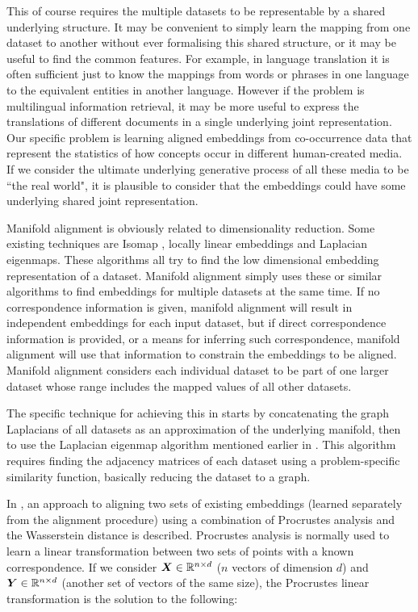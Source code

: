 This of course requires the multiple datasets to be representable by a shared underlying structure. It may be convenient to simply learn the mapping from one dataset to another without ever formalising this shared structure, or it may be useful to find the common features. For example, in language translation it is often sufficient just to know the mappings from words or phrases in one language to the equivalent entities in another language. However if the problem is multilingual information retrieval, it may be more useful to express the translations of different documents in a single underlying joint representation. Our specific problem is learning aligned embeddings from co-occurrence data that represent the statistics of how concepts occur in different human-created media. If we consider the ultimate underlying generative process of all these media to be ``the real world", it is plausible to consider that the embeddings could have some underlying shared joint representation. 

Manifold alignment is obviously related to dimensionality reduction. Some existing techniques are Isomap , locally linear embeddings and Laplacian eigenmaps. These algorithms all try to find the low dimensional embedding representation of a dataset. Manifold alignment simply uses these or similar algorithms to find embeddings for multiple datasets at the same time. If no correspondence information is given, manifold alignment will result in independent embeddings for each input dataset, but if direct correspondence information is provided, or a means for inferring such correspondence, manifold alignment will use that information to constrain the embeddings to be aligned. Manifold alignment considers each individual dataset to be part of one larger dataset whose range includes the mapped values of all other datasets. 

The specific technique for achieving this in \cite{ManifoldLearningTheoryAndApplications} starts by concatenating the graph Laplacians of all datasets as an approximation of the underlying manifold, then to use the Laplacian eigenmap algorithm mentioned earlier in \cite{LaplacianEigenmaps}. This algorithm requires finding the adjacency matrices of each dataset using a problem-specific similarity function, basically reducing the dataset to a graph. 

In \cite{UnsupervisedAlignmentWP}, an approach to aligning two sets of existing embeddings (learned separately from the alignment procedure) using a combination of Procrustes analysis and the Wasserstein distance is described. Procrustes analysis is normally used to learn a linear transformation between two sets of points with a known correspondence. If we consider $\boldsymbol{X} \in \mathbb{R}^{n \times d}$ ($n$ vectors of dimension $d$) and $\boldsymbol{Y} \in \mathbb{R}^{n \times d}$ (another set of vectors of the same size), the Procrustes linear transformation is the solution to the following:

